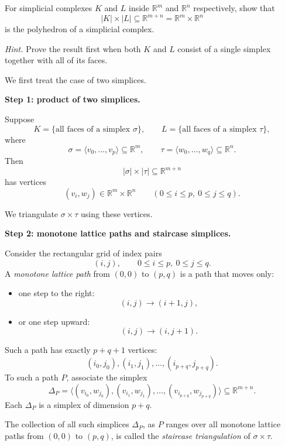 \begin{problem}
For simplicial complexes \(K\) and \(L\) inside \(\mathbb R^m\) and \(\mathbb R^n\) respectively, show that
\[
|K|\times |L| \subseteq \mathbb R^{m+n}=\mathbb R^m\times \mathbb R^n
\]
is the polyhedron of a simplicial complex.

\medskip
\noindent\emph{Hint.} Prove the result first when both \(K\) and \(L\) consist of a single simplex together with all of its faces.
\smallskip
\end{problem}

\begin{solution}
We first treat the case of two simplices.

\par

\textbf{Step 1: product of two simplices.}

Suppose
\[
K=\{\text{all faces of a simplex }\sigma\},
\qquad
L=\{\text{all faces of a simplex }\tau\},
\]
where
\[
\sigma=\langle v_0,\dots,v_p\rangle \subseteq \mathbb R^m,
\qquad
\tau=\langle w_0,\dots,w_q\rangle \subseteq \mathbb R^n.
\]
Then
\[
|\sigma|\times |\tau| \subseteq \mathbb R^{m+n}
\]
has vertices
\[
(v_i,w_j)\in \mathbb R^m\times \mathbb R^n
\qquad
(0\le i\le p,\ 0\le j\le q).
\]

We triangulate \(\sigma\times \tau\) using these vertices.

\par

\textbf{Step 2: monotone lattice paths and staircase simplices.}

Consider the rectangular grid of index pairs
\[
(i,j),
\qquad
0\le i\le p,\ 0\le j\le q.
\]
A \emph{monotone lattice path} from \((0,0)\) to \((p,q)\) is a path that moves only:
\begin{itemize}
	\item one step to the right:
	\[
	(i,j)\to (i+1,j),
	\]
	\item or one step upward:
	\[
	(i,j)\to (i,j+1).
	\]
\end{itemize}

Such a path has exactly \(p+q+1\) vertices:
\[
(i_0,j_0),(i_1,j_1),\dots,(i_{p+q},j_{p+q}).
\]
To such a path \(P\), associate the simplex
\[
\Delta_P=
\langle
(v_{i_0},w_{j_0}),
(v_{i_1},w_{j_1}),
\dots,
(v_{i_{p+q}},w_{j_{p+q}})
\rangle
\subseteq \mathbb R^{m+n}.
\]
Each \(\Delta_P\) is a simplex of dimension \(p+q\).

The collection of all such simplices \(\Delta_P\), as \(P\) ranges over all monotone lattice paths from \((0,0)\) to \((p,q)\), is called the \emph{staircase triangulation} of \(\sigma\times\tau\).


\end{solution}
